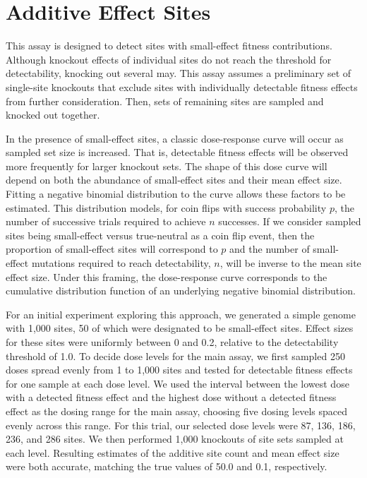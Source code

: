 \section{Additive Effect Sites}

This assay is designed to detect sites with small-effect fitness contributions.
Although knockout effects of individual sites do not reach the threshold for detectability, knocking out several may.
This assay assumes a preliminary set of single-site knockouts that exclude sites with individually detectable fitness effects from further consideration.
Then, sets of remaining sites are sampled and knocked out together.

In the presence of small-effect sites, a classic dose-response curve will occur as sampled set size is increased.
That is, detectable fitness effects will be observed more frequently for larger knockout sets.
The shape of this dose curve will depend on both the abundance of small-effect sites and their mean effect size.
Fitting a negative binomial distribution to the curve allows these factors to be estimated.
This distribution models, for coin flips with success probability $p$, the number of successive trials required to achieve $n$ successes.
If we consider sampled sites being small-effect versus true-neutral as a coin flip event, then the proportion of small-effect sites will correspond to $p$ and the number of small-effect mutations required to reach detectability, $n$, will be inverse to the mean site effect size.
Under this framing, the dose-response curve corresponds to the cumulative distribution function of an underlying negative binomial distribution.

For an initial experiment exploring this approach, we generated a simple genome with 1,000 sites, 50 of which were designated to be small-effect sites.
Effect sizes for these sites were uniformly between 0 and 0.2, relative to the detectability threshold of 1.0.
To decide dose levels for the main assay, we first sampled 250 doses spread evenly from 1 to 1,000 sites and tested for detectable fitness effects for one sample at each dose level.
We used the interval between the lowest dose with a detected fitness effect and the highest dose without a detected fitness effect as the dosing range for the main assay, choosing five dosing levels spaced evenly across this range.
For this trial, our selected dose levels were 87, 136, 186, 236, and 286 sites.
We then performed 1,000 knockouts of site sets sampled at each level.
Resulting estimates of the additive site count and mean effect size were both accurate, matching the true values of 50.0 and 0.1, respectively.

